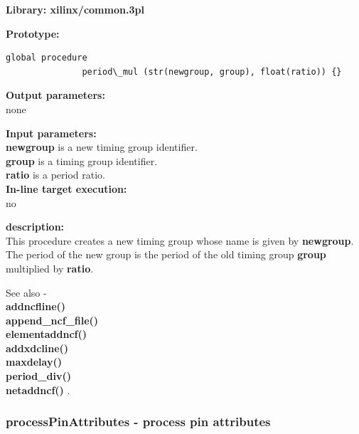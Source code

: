             {\bf Library: xilinx/common.3pl}

            {\bf Prototype:} \\
            \vsp
            \begin{lstlisting}[gobble=12, language=threepl]
               global procedure
               period\_mul (str(newgroup, group), float(ratio)) {}
            \end{lstlisting}

            {\bf Output parameters:} \\
            none

            {\bf Input parameters:} \\            
            {\bf newgroup} is a new timing group identifier. \\
            {\bf group} is a timing group identifier. \\
            {\bf ratio} is a period ratio. \\
        
            {\bf In-line target execution:} \\
            no

            {\bf description:} \\
            This procedure creates a new timing group whose name is
            given by {\bf newgroup}. The period of the new group is
            the period of the old timing group {\bf group} multiplied
            by {\bf ratio}.
            
            See also - \\
            {\bf addncfline()} \\
            {\bf append\_ncf\_file()} \\
            {\bf elementaddncf()} \\
            {\bf addxdcline()} \\
            {\bf maxdelay()} \\
            {\bf period\_div()} \\
            {\bf netaddncf()} .
 

        \subsubsection{processPinAttributes - process pin attributes}\label{sec:lpprocPinAtt}
            
